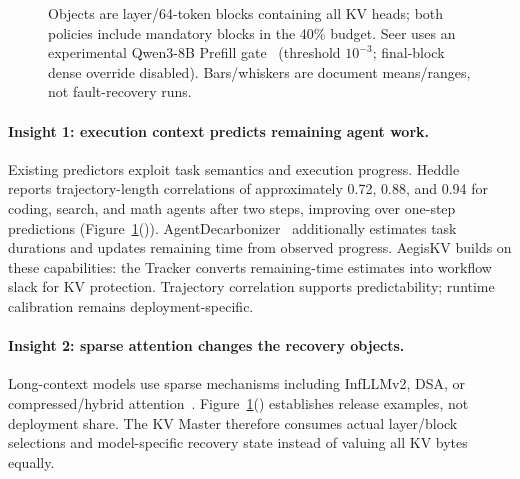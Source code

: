\begin{figure}[t]
{    Objects are layer/64-token blocks containing all KV heads; both
    policies include mandatory blocks in the 40\% budget.
    Seer uses an experimental Qwen3-8B Prefill gate~\cite{song2026seerqwen3}
    (threshold $10^{-3}$; final-block dense override disabled).
    Bars/whiskers are document means/ranges, not fault-recovery runs.}
  \label{fig:design-insights}
\end{figure}

\paragraph{Insight 1: execution context predicts remaining agent work.}
Existing predictors exploit task semantics and execution progress.
Heddle~\cite{zhang2026heddle} reports trajectory-length correlations of
approximately 0.72, 0.88, and 0.94 for coding, search, and math agents
after two steps, improving over one-step predictions
(Figure~\ref{fig:design-insights}()).
AgentDecarbonizer~\cite{yan2026agentdecarbonizer} additionally estimates
task durations and updates remaining time from observed progress.
AegisKV builds on these capabilities: the Tracker converts remaining-time
estimates into workflow slack for KV protection. Trajectory correlation
supports predictability; runtime calibration remains deployment-specific.

\paragraph{Insight 2: sparse attention changes the recovery objects.}
Long-context models use sparse mechanisms including InfLLMv2,
DSA, or compressed/hybrid attention~\cite{minicpm4model,
openbmb2025minicpm41,deepseek2025v32exp,deepseek2025v32model,
zai2026glm5model,openbmb2026sala,deepseek2026v4model,minimax2026m3,
zai2026glm52,longcat2026sparse}.
Figure~\ref{fig:design-insights}()
establishes release examples, not deployment share.
The KV Master therefore consumes actual layer/block selections and
model-specific recovery state instead of valuing all KV bytes equally.

